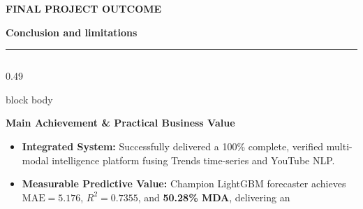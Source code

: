 \documentclass[aspectratio=169, 10pt]{beamer}
\newcommand{\slideheader}[3]{%
        \vspace{-0.25cm}%
        \noindent\begin{minipage}[t]{0.88\linewidth}%
            {\fontsize{7pt}{8.5pt}\selectfont \textbf{\color{BlueAccent}#1}}\par\vspace{1pt}%
            {\fontsize{11.5pt}{13.5pt}\selectfont \textbf{\color{NavyPrimary}#2}}%
        \end{minipage}%
        \hfill%
        \begin{minipage}[t]{0.10\linewidth}%
            \raggedleft{\fontsize{12pt}{14pt}\selectfont \textbf{\color{CoralAccent}#3}}%
        \end{minipage}\par%
        \vspace{2pt}%
        \textcolor{CardBorder}{\rule{\linewidth}{0.6pt}}\par%
        \vspace{3pt}%
    }
\newenvironment{card}[1][]{%
        \begin{beamercolorbox}[rounded=true,shadow=false,wd=\linewidth,sep=3.5pt,#1]{block body}%
        \fontsize{7.8pt}{9.8pt}\selectfont%
    }{%
        \end{beamercolorbox}%
    }
\begin{document}
    \begin{frame}[t]                                                                                                                                                                                   
        \slideheader{FINAL PROJECT OUTCOME}{Conclusion and limitations}{17}                                                                                                                            
        \begin{columns}[T]                                                                                                                                                                             
            \begin{column}{0.49\textwidth}                                                                                                                                                             
                \begin{card}                                                                                                                                                                           
                    {\fontsize{8pt}{9.5pt}\selectfont \textbf{\color{NavyPrimary}Main Achievement \& Practical Business Value}}\\[0.06cm]                                                              
                    \begin{itemize}\setlength{\itemsep}{2pt}                                                                                                                                           
                        \item \textbf{Integrated System:} Successfully delivered a 100\% complete, verified multi-modal intelligence platform fusing Trends time-series and YouTube NLP.               
                        \item \textbf{Measurable Predictive Value:} Champion LightGBM forecaster achieves \textbf{$\text{MAE} = 5.176$}, \textbf{$R^2 = 0.7355$}, and \textbf{50.28\% MDA}, delivering an 

\end{itemize}
\end{card}
\end{column}
\end{columns}
\end{frame}
\end{document}

